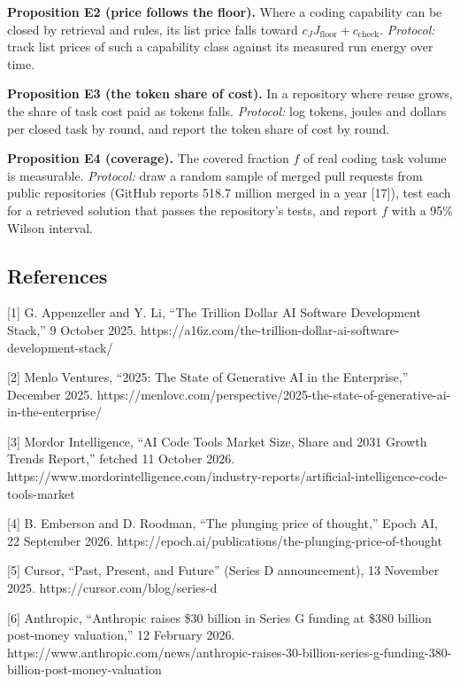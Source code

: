\documentclass[
  10pt,
]{article}
\begin{document}
\textbf{Proposition E2 (price follows the floor).} Where a coding
capability can be closed by retrieval and rules, its list price falls
toward \(c_J J_{\text{floor}} + c_{\text{check}}\). \emph{Protocol:}
track list prices of such a capability class against its measured run
energy over time.

\textbf{Proposition E3 (the token share of cost).} In a repository where
reuse grows, the share of task cost paid as tokens falls.
\emph{Protocol:} log tokens, joules and dollars per closed task by
round, and report the token share of cost by round.

\textbf{Proposition E4 (coverage).} The covered fraction \(f\) of real
coding task volume is measurable. \emph{Protocol:} draw a random sample
of merged pull requests from public repositories (GitHub reports 518.7
million merged in a year {[}17{]}), test each for a retrieved solution
that passes the repository's tests, and report \(f\) with a 95\% Wilson
interval.

\subsection{References}\label{references}

{[}1{]} G. Appenzeller and Y. Li, ``The Trillion Dollar AI Software
Development Stack,'' 9 October 2025.
https://a16z.com/the-trillion-dollar-ai-software-development-stack/

{[}2{]} Menlo Ventures, ``2025: The State of Generative AI in the
Enterprise,'' December 2025.
https://menlovc.com/perspective/2025-the-state-of-generative-ai-in-the-enterprise/

{[}3{]} Mordor Intelligence, ``AI Code Tools Market Size, Share and 2031
Growth Trends Report,'' fetched 11 October 2026.
https://www.mordorintelligence.com/industry-reports/artificial-intelligence-code-tools-market

{[}4{]} B. Emberson and D. Roodman, ``The plunging price of thought,''
Epoch AI, 22 September 2026.
https://epoch.ai/publications/the-plunging-price-of-thought

{[}5{]} Cursor, ``Past, Present, and Future'' (Series D announcement),
13 November 2025. https://cursor.com/blog/series-d

{[}6{]} Anthropic, ``Anthropic raises \$30 billion in Series G funding
at \$380 billion post-money valuation,'' 12 February 2026.
https://www.anthropic.com/news/anthropic-raises-30-billion-series-g-funding-380-billion-post-money-valuation
\end{document}
